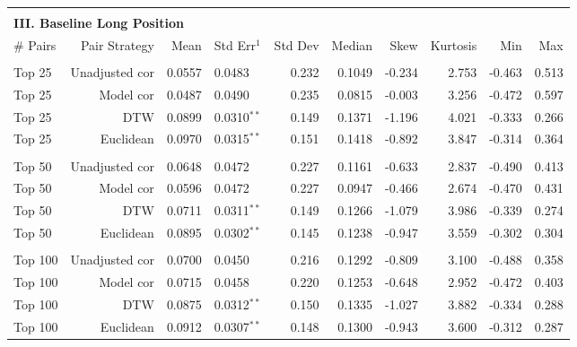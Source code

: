 \documentclass[12pt]{article}
\begin{document}
\begin{table}[hp]
\begin{tabular}{l r r l r r r r r r}
        \vspace{-1mm} \\
        \hline
        \vspace{1 mm} \\
        \multicolumn{9}{l}{\textbf{III. Baseline Long Position}} \\
        \# Pairs & Pair Strategy & Mean & Std Err{$^{1}$} & Std Dev & Median & Skew & Kurtosis & Min & Max \\
        \hline
        \vspace{-1mm} \\
        Top 25    & Unadjusted cor & 0.0557 & 0.0483          & 0.232 & 0.1049 & -0.234 & 2.753 & -0.463 & 0.513 \\
        Top 25    & Model cor      & 0.0487 & 0.0490          & 0.235 & 0.0815 & -0.003 & 3.256 & -0.472 & 0.597 \\
        Top 25    & DTW            & 0.0899 & 0.0310{$^{**}$} & 0.149 & 0.1371 & -1.196 & 4.021 & -0.333 & 0.266 \\
        Top 25    & Euclidean      & 0.0970 & 0.0315{$^{**}$} & 0.151 & 0.1418 & -0.892 & 3.847 & -0.314 & 0.364 \\
        \vspace{-1mm} \\
        Top 50    & Unadjusted cor & 0.0648 & 0.0472          & 0.227 & 0.1161 & -0.633 & 2.837 & -0.490 & 0.413 \\
        Top 50    & Model cor      & 0.0596 & 0.0472          & 0.227 & 0.0947 & -0.466 & 2.674 & -0.470 & 0.431 \\
        Top 50    & DTW            & 0.0711 & 0.0311{$^{**}$} & 0.149 & 0.1266 & -1.079 & 3.986 & -0.339 & 0.274 \\
        Top 50    & Euclidean      & 0.0895 & 0.0302{$^{**}$} & 0.145 & 0.1238 & -0.947 & 3.559 & -0.302 & 0.304 \\
        \vspace{-1mm} \\
        Top 100   & Unadjusted cor & 0.0700 & 0.0450          & 0.216 & 0.1292 & -0.809 & 3.100 & -0.488 & 0.358 \\
        Top 100   & Model cor      & 0.0715 & 0.0458          & 0.220 & 0.1253 & -0.648 & 2.952 & -0.472 & 0.403 \\
        Top 100   & DTW            & 0.0875 & 0.0312{$^{**}$} & 0.150 & 0.1335 & -1.027 & 3.882 & -0.334 & 0.288 \\
        Top 100   & Euclidean      & 0.0912 & 0.0307{$^{**}$} & 0.148 & 0.1300 & -0.943 & 3.600 & -0.312 & 0.287 \\

\end{tabular}
\end{table}
\end{document}
